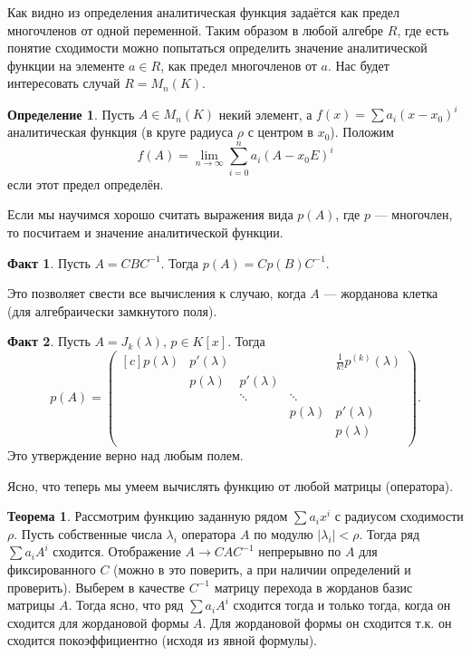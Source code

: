 \documentclass[10pt,a4paper,oneside]{book}
\theoremstyle{definition}
\newtheorem{defn}{Определение}
\newtheorem*{fact}{Факт}
\newtheorem*{thmm}{Теорема}
\begin{document}
Как видно из определения аналитическая функция задаётся как предел многочленов от одной переменной. Таким образом в любой алгебре $R$, где есть понятие сходимости можно попытаться определить значение аналитической функции на элементе $a\in R$, как предел многочленов от $a$. Нас будет интересовать случай $R=M_n(K)$.

\begin{defn}
Пусть $A\in M_n(K)$ некий элемент, а $f(x)=\sum a_i (x-x_0)^i$ аналитическая функция (в круге радиуса $\rho$ с центром в $x_0$). Положим   $$f(A)=\lim_{n\to \infty} \sum_{i=0}^n a_i (A-x_0E)^i$$
если этот предел определён. 
\end{defn}

Если мы научимся хорошо считать выражения вида $p(A)$, где $p$ --- многочлен, то посчитаем и значение аналитической функции.

\begin{fact}
Пусть $A=CBC^{-1}$. Тогда $p(A)=Cp(B)C^{-1}$.
\end{fact}

Это позволяет свести все вычисления к случаю, когда $A$ --- жорданова клетка (для алгебраически замкнутого поля). 

\begin{fact}
Пусть $A=J_k(\lambda)$, $p\in K[x]$. Тогда
$$p(A)=\begin{pmatrix*}[c]
p(\lambda)& p'(\lambda) &  & &\frac{1}{k!}p^{(k)}(\lambda)\\
 & p(\lambda) & p'(\lambda)& & \\
 &  &\ddots &\ddots  &  \\
 & & & p(\lambda) & p'(\lambda)\\
&  & && p(\lambda) \\
\end{pmatrix*}.$$
Это утверждение верно над любым полем.
\end{fact}

Ясно, что теперь мы умеем вычислять функцию от любой матрицы (оператора).

\begin{thmm}
Рассмотрим функцию заданную рядом $\sum a_i x^i$  с радиусом сходимости $\rho$. Пусть собственные числа $\lambda_i$ оператора $A$ по модулю $|\lambda_i|<\rho$. Тогда ряд $\sum a_i A^i$ сходится.
\proof Отображение $A\to C A C^{-1}$ непрерывно по $A$ для фиксированного $C$ (можно в это поверить, а при наличии определений и проверить). Выберем в качестве $C^{-1}$ матрицу перехода в жорданов базис матрицы $A$. Тогда ясно, что  ряд $\sum a_i A^i$ сходится тогда и только тогда, когда он сходится для жордановой формы $A$. Для жордановой формы он сходится т.к. он сходится покоэффициентно (исходя из явной формулы). 
\end{thmm}
\end{document}
